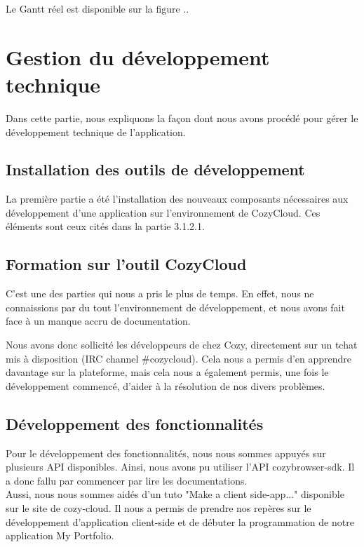 Le Gantt réel est disponible sur la figure ..

\section{Gestion du développement technique}

Dans cette partie, nous expliquons la façon dont nous avons procédé pour gérer le développement technique de l'application.

\subsection{Installation des outils de développement}

La première partie a été l'installation des nouveaux composants nécessaires aux développement d'une application sur l'environnement de CozyCloud. Ces éléments sont ceux cités dans la partie 3.1.2.1.


\subsection{Formation sur l'outil CozyCloud}

C'est une des parties qui nous a pris le plus de temps. En effet, nous ne connaissions par du tout l'environnement de développement, et nous avons fait face à un manque accru de documentation.

Nous avons donc sollicité les développeurs de chez Cozy, directement sur un tchat mis à disposition (IRC channel #cozycloud). Cela nous a permis d'en apprendre davantage sur la plateforme, mais cela nous a également permis, une fois le développement commencé, d'aider à la résolution de nos divers problèmes.

\subsection{Développement des fonctionnalités}

Pour le développement des fonctionnalités, nous nous sommes appuyés sur plusieurs API disponibles. Ainsi, nous avons pu utiliser l'API cozybrowser-sdk. Il a donc fallu par commencer par lire les documentations. \\

Aussi, nous nous sommes aidés d'un tuto "Make a client side-app..." disponible sur le site de cozy-cloud. Il nous a permis de prendre nos repères sur le développement d'application client-side et de débuter la programmation de notre application My Portfolio.